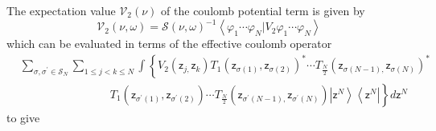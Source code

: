 \documentclass[aps,preprint]{revtex4}%
\begin{document}
The expectation value $\mathcal{V}_{2}\left(  \nu\right)  $ of the coulomb
potential term is given by
\begin{equation}
\mathcal{V}_{2}\left(  \nu,\omega\right)  =\mathcal{S}\left(  \nu
,\omega\right)  ^{-1}\left\langle \varphi_{1}\cdots\varphi_{N}\left\vert
V_{2}\right.  \varphi_{1}\cdots\varphi_{N}\right\rangle
\end{equation}
which can be evaluated in terms of the effective coulomb operator
\begin{align}
&
{\textstyle\sum\limits_{\sigma,\sigma^{\prime}\in\mathcal{S}_{N}}}
{\displaystyle\sum\limits_{1\leq j<k\leq N}}
\int\left\{  V_{2}\left(  \mathsf{z}_{j,}\mathsf{z}_{k}\right)  T_{1}\left(
\mathsf{z}_{\sigma\left(  1\right)  },\mathsf{z}_{\sigma\left(  2\right)
}\right)  ^{\ast}\cdots T_{\frac{N}{2}}\left(  \mathsf{z}_{\sigma\left(
N-1\right)  ,}\mathsf{z}_{\sigma\left(  N\right)  }\right)  ^{\ast}\right.
\nonumber\\
&  \qquad\qquad\qquad\qquad\left.  T_{1}\left(  \mathsf{z}_{\sigma^{\prime
}\left(  1\right)  },\mathsf{z}_{\sigma^{\prime}\left(  2\right)  }\right)
\cdots T_{\frac{N}{2}}\left(  \mathsf{z}_{\sigma^{\prime}\left(  N-1\right)
,}\mathsf{z}_{\sigma^{\prime}\left(  N\right)  }\right)  \left\vert
\mathsf{z}^{N}\right\rangle \left\langle \mathsf{z}^{N}\right\vert \right\}
d\mathsf{z}^{N}%
\end{align}
to give%
\end{document}
